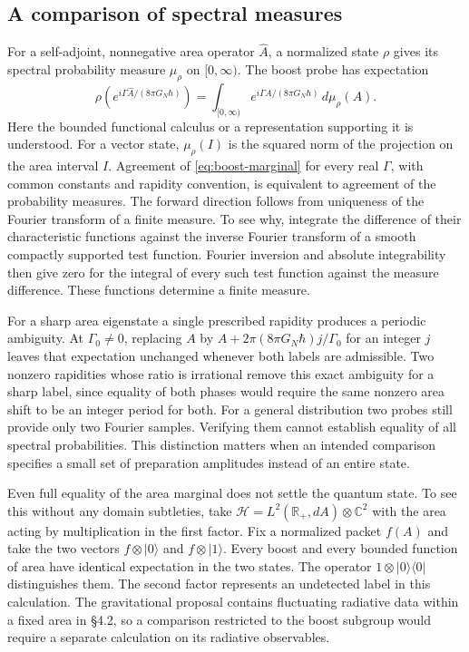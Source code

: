 \documentclass[11pt,letterpaper]{article}
\newcommand{\CC}{\mathbb C}
\newcommand{\RR}{\mathbb R}
\begin{document}
\subsection{A comparison of spectral measures}
For a self-adjoint, nonnegative area operator $\widehat A$, a normalized state $\rho$ gives its
spectral probability measure $\mu_\rho$ on $[0,\infty)$. The boost probe has expectation
\begin{equation}
 \rho\!\left(e^{i\Gamma\widehat A/(8\pi G_N\hbar)}\right)
     =\int_{[0,\infty)} e^{i\Gamma A/(8\pi G_N\hbar)}\,d\mu_\rho(A).
 \label{eq:boost-marginal}
\end{equation}
Here the bounded functional calculus or a representation supporting it is understood. For a
vector state, $\mu_\rho(I)$ is the squared norm of the projection on the area interval $I$.
Agreement of \eqref{eq:boost-marginal} for every real $\Gamma$, with common constants and
rapidity convention, is equivalent to agreement of the probability measures. The forward
direction follows from uniqueness of the Fourier transform of a finite measure. To see why,
integrate the difference of their characteristic functions against the inverse Fourier
transform of a smooth compactly supported test function. Fourier inversion and absolute
integrability then give zero for the integral of every such test function against the measure
difference. These functions determine a finite measure.

For a sharp area eigenstate a single prescribed rapidity produces a periodic ambiguity. At
$\Gamma_0\ne0$, replacing $A$ by $A+2\pi (8\pi G_N\hbar)j/\Gamma_0$ for an integer $j$ leaves
that expectation unchanged whenever both labels are admissible. Two nonzero rapidities whose
ratio is irrational remove this exact ambiguity for a sharp label, since equality of both
phases would require the same nonzero area shift to be an integer period for both. For a
general distribution two probes still provide only two Fourier samples. Verifying them cannot
establish equality of all spectral probabilities. This distinction matters when an intended
comparison specifies a small set of preparation amplitudes instead of an entire state.

Even full equality of the area marginal does not settle the quantum state. To see this without
any domain subtleties, take $\mathcal H=L^2(\RR_+,dA)\otimes\CC^2$ with the area acting by
multiplication in the first factor. Fix a normalized packet $f(A)$ and take the two vectors
$f\otimes |0\rangle$ and $f\otimes |1\rangle$. Every boost and every bounded function of area
have identical expectation in the two states. The operator $1\otimes |0\rangle\langle0|$
distinguishes them. The second factor represents an undetected label in this calculation. The
gravitational proposal contains fluctuating radiative data within a fixed area in \S4.2, so a
comparison restricted to the boost subgroup would require a separate calculation on its
radiative observables.
\end{document}
